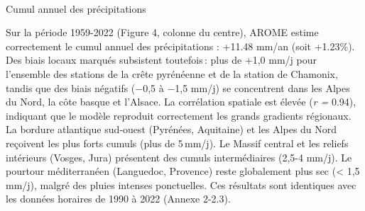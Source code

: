\documentclass[
  article,
  nofooter,
  noheadings]{jss}
\makeatletter
\let\oldparagraph\paragraph
\renewcommand{\paragraph}{
    \@ifstar
      \xxxParagraphStar
      \xxxParagraphNoStar
  }
\newcommand{\xxxParagraphStar}[1]{\oldparagraph*{#1}\mbox{}}
\newcommand{\xxxParagraphNoStar}[1]{\oldparagraph{#1}\mbox{}}
\makeatother
\begin{document}
\paragraph{Cumul annuel des
précipitations}\label{cumul-annuel-des-pruxe9cipitations}

Sur la période 1959-2022 (Figure 4, colonne du centre), AROME estime
correctement le cumul annuel des précipitations : +11.48 mm/an (soit
+1.23\%). Des biais locaux marqués subsistent toutefois\,: plus de +1,0
mm/j pour l'ensemble des stations de la crête pyrénéenne et de la
station de Chamonix, tandis que des biais négatifs (−0,5 à −1,5 mm/j) se
concentrent dans les Alpes du Nord, la côte basque et l'Alsace. La
corrélation spatiale est élevée (\emph{r =} 0.94), indiquant que le
modèle reproduit correctement les grands gradients régionaux. La bordure
atlantique sud‑ouest (Pyrénées, Aquitaine) et les Alpes du Nord
reçoivent les plus forts cumuls (plus de 5\,mm/j). Le Massif central et
les reliefs intérieurs (Vosges, Jura) présentent des cumuls
intermédiaires (2,5-4 mm/j). Le pourtour méditerranéen (Languedoc,
Provence) reste globalement plus sec (\textless{} 1,5 mm/j), malgré des
pluies intenses ponctuelles. Ces résultats sont identiques avec les
données horaires de 1990 à 2022 (Annexe 2-2.3).

\setlength{\tabcolsep}{0pt}
\end{document}
